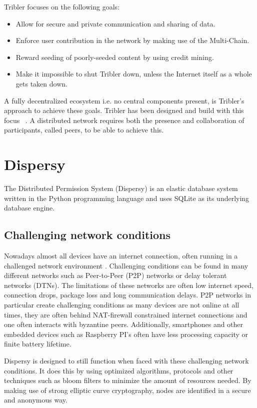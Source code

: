 Tribler focuses on the following goals:
\begin{itemize}
    \item Allow for secure and private communication and sharing of data.
    \item Enforce user contribution in the network by making use of the Multi-Chain.
    \item Reward seeding of poorly-seeded content by using credit mining.
    \item Make it impossible to shut Tribler down, unless the Internet itself as a whole gets taken down.
\end{itemize}

A fully decentralized ecosystem i.e. no central components present, is Tribler's approach to achieve these goals.
Tribler has been designed and build with this focus~\cite{Pouwelse-tribler,Bakker-tribler} .
A distributed network requires both the presence and collaboration of participants, called peers, to be able to achieve this.

\section{Dispersy}
The Distributed Permission System (Dispersy) is an elastic database system written in the Python programming language and uses SQLite as its underlying database engine.

\subsection{Challenging network conditions}
Nowadays almost all devices have an internet connection, often running in a challenged network environment \cite{dispersy2016dispersy}.
Challenging conditions can be found in many different networks such as Peer-to-Peer (P2P) networks or delay tolerant networks (DTNs).
The limitations of these networks are often low internet speed, connection drops, package loss and long communication delays.
P2P networks in particular create challenging conditions as many devices are not online at all times, they are often behind NAT-firewall constrained internet connections and one often interacts with byzantine peers.
Additionally, smartphones and other embedded devices such as Raspberry PI's often have less processing capacity or finite battery lifetime.

Dispersy is designed to still function when faced with these challenging network conditions.
It does this by using optimized algorithms, protocols and other techniques such as bloom filters to minimize the amount of resources needed.
By making use of strong elliptic curve cryptography, nodes are identified in a secure and anonymous way.

